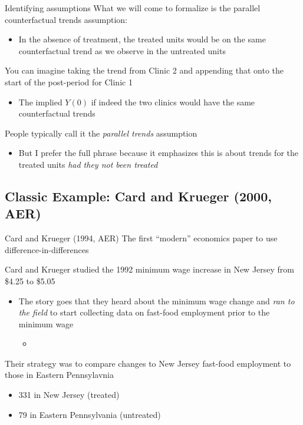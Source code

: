 \documentclass[aspectratio=169,t,11pt,table]{beamer}
\begin{document}
\begin{frame}{Identifying assumptions}
  What we will come to formalize is the \alert{parallel counterfactual trends} assumption:
  \begin{itemize}
    \item In the absence of treatment, the treated units would be on the same counterfactual trend as we observe in the untreated units
  \end{itemize}

  \bigskip
  You can imagine taking the trend from Clinic 2 and appending that onto the start of the post-period for Clinic 1
  \begin{itemize}
    \item The implied $Y(0)$ if indeed the two clinics would have the same counterfactual trends
  \end{itemize}

  \bigskip
  People typically call it the \emph{parallel trends} assumption
  \begin{itemize}
    \item But I prefer the full phrase because it emphasizes this is about trends for the treated units \emph{had they not been treated}
  \end{itemize}
\end{frame}


%   

\subsection{Classic Example: Card and Krueger (2000, AER)}

\begin{frame}{Card and Krueger (1994, AER)}
  The first ``modern'' economics paper to use difference-in-differences

  \bigskip
  Card and Krueger studied the 1992 minimum wage increase in New Jersey from \$4.25 to \$5.05
  \begin{itemize}
    \item The story goes that they heard about the minimum wage change and \emph{ran to the field} to start collecting data on fast-food employment prior to the minimum wage
    \begin{itemize}
      \item 
    \end{itemize}
  \end{itemize}

  \pause
  \bigskip
  Their strategy was to compare changes to New Jersey fast-food employment to those in Eastern Pennsylavnia
  \begin{itemize}
    \item 331 in New Jersey (treated)
    \item 79 in Eastern Pennsylvania (untreated)
  \end{itemize}
\end{frame}
\end{document}
